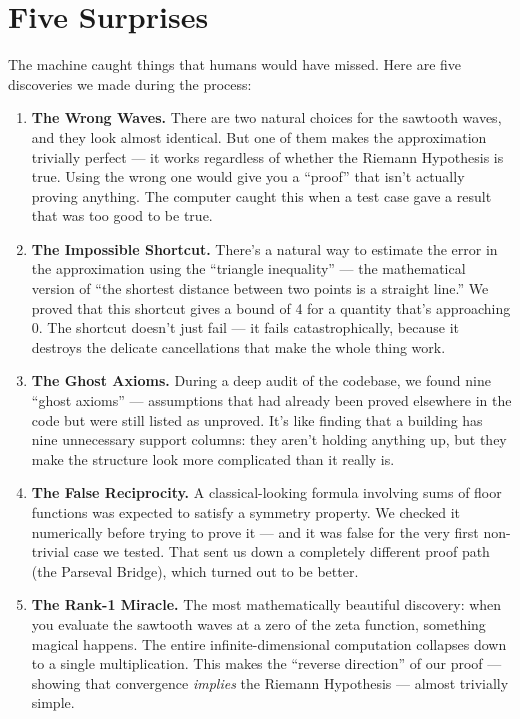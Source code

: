 \documentclass[12pt,a4paper]{article}
\begin{document}
\section*{Five Surprises}

The machine caught things that humans would have missed. Here are
five discoveries we made during the process:

\begin{enumerate}
  \item \textbf{The Wrong Waves.} There are two natural choices for the
    sawtooth waves, and they look almost identical. But one of them
    makes the approximation trivially perfect --- it works regardless of
    whether the Riemann Hypothesis is true. Using the wrong one would
    give you a ``proof'' that isn't actually proving anything. The
    computer caught this when a test case gave a result that was too good
    to be true.

  \item \textbf{The Impossible Shortcut.} There's a natural way to
    estimate the error in the approximation using the ``triangle
    inequality'' --- the mathematical version of ``the shortest distance
    between two points is a straight line.'' We proved that this shortcut
    gives a bound of 4 for a quantity that's approaching 0. The shortcut
    doesn't just fail --- it fails catastrophically, because it destroys
    the delicate cancellations that make the whole thing work.

  \item \textbf{The Ghost Axioms.} During a deep audit of the codebase,
    we found nine ``ghost axioms'' --- assumptions that had already been
    proved elsewhere in the code but were still listed as unproved. It's
    like finding that a building has nine unnecessary support columns: they
    aren't holding anything up, but they make the structure look more
    complicated than it really is.

  \item \textbf{The False Reciprocity.} A classical-looking formula
    involving sums of floor functions was expected to satisfy a symmetry
    property. We checked it numerically before trying to prove it --- and
    it was false for the very first non-trivial case we tested. That
    sent us down a completely different proof path (the Parseval Bridge),
    which turned out to be better.

  \item \textbf{The Rank-1 Miracle.} The most mathematically beautiful
    discovery: when you evaluate the sawtooth waves at a zero of the
    zeta function, something magical happens. The entire infinite-dimensional
    computation collapses down to a single multiplication. This makes the
    ``reverse direction'' of our proof --- showing that convergence
    \emph{implies} the Riemann Hypothesis --- almost trivially simple.
\end{enumerate}
\end{document}
